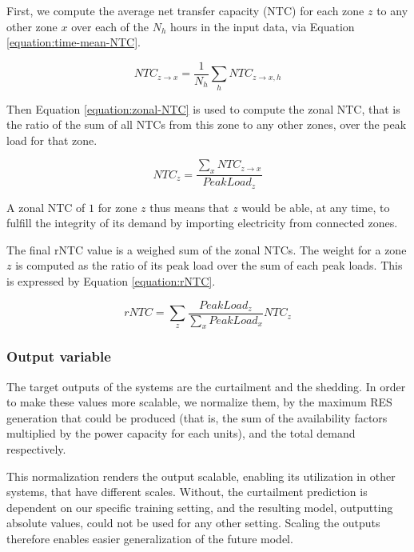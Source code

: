 \begin{enumerate}
    First, we compute the average net transfer capacity (NTC) for each zone $z$ to any other zone $x$ over each of the $N_h$ hours in the input data, via Equation \ref{equation:time-mean-NTC}.

    \begin{equation}
        NTC_{z\rightarrow x} = \frac{1}{N_h} \sum_h NTC_{z\rightarrow x,h}
        \label{equation:time-mean-NTC}
    \end{equation}

    Then Equation \ref{equation:zonal-NTC} is used to compute the zonal NTC, that is the ratio of the sum of all NTCs from this zone to any other zones, over the peak load for that zone.

    \begin{equation}
        NTC_z = \frac{\sum_x NTC_{z\rightarrow x}}{PeakLoad_z}
        \label{equation:zonal-NTC}
    \end{equation}

    A zonal NTC of $1$ for zone $z$ thus means that $z$ would be able, at any time, to fulfill the integrity of its demand by importing electricity from connected zones.

    The final rNTC value is a weighed sum of the zonal NTCs. The weight for a zone $z$ is computed as the ratio of its peak load over the sum of each peak loads. This is expressed by Equation \ref{equation:rNTC}.

    \begin{equation}
        rNTC = \sum_z \frac{PeakLoad_z}{\sum_x PeakLoad_x} NTC_z
        \label{equation:rNTC}
    \end{equation}
\end{enumerate}

\subsubsection{Output variable}

The target outputs of the systems are the curtailment and the shedding. In order to make these values more scalable, we normalize them, by the maximum RES generation that could be produced (that is, the sum of the availability factors multiplied by the power capacity for each units), and the total demand respectively.

This normalization renders the output scalable, enabling its utilization in other systems, that have different scales. Without, the curtailment prediction is dependent on our specific training setting, and the resulting model, outputting absolute values, could not be used for any other setting. Scaling the outputs therefore enables easier generalization of the future model.

